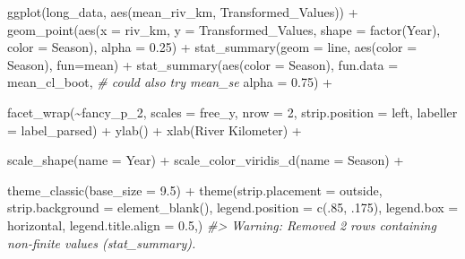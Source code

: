 \documentclass[
]{article}
\newenvironment{Shaded}{\begin{snugshade}}{\end{snugshade}}
\newcommand{\AttributeTok}[1]{\textcolor[rgb]{0.77,0.63,0.00}{#1}}
\newcommand{\CommentTok}[1]{\textcolor[rgb]{0.56,0.35,0.01}{\textit{#1}}}
\newcommand{\DecValTok}[1]{\textcolor[rgb]{0.00,0.00,0.81}{#1}}
\newcommand{\FloatTok}[1]{\textcolor[rgb]{0.00,0.00,0.81}{#1}}
\newcommand{\FunctionTok}[1]{\textcolor[rgb]{0.00,0.00,0.00}{#1}}
\newcommand{\NormalTok}[1]{#1}
\newcommand{\SpecialCharTok}[1]{\textcolor[rgb]{0.00,0.00,0.00}{#1}}
\newcommand{\StringTok}[1]{\textcolor[rgb]{0.31,0.60,0.02}{#1}}
\begin{document}
\begin{Shaded}
\begin{Highlighting}[]
\FunctionTok{ggplot}\NormalTok{(long\_data, }\FunctionTok{aes}\NormalTok{(mean\_riv\_km, Transformed\_Values)) }\SpecialCharTok{+}
  \FunctionTok{geom\_point}\NormalTok{(}\FunctionTok{aes}\NormalTok{(}\AttributeTok{x =}\NormalTok{ riv\_km, }\AttributeTok{y =}\NormalTok{ Transformed\_Values, }
                 \AttributeTok{shape =} \FunctionTok{factor}\NormalTok{(Year), }\AttributeTok{color =}\NormalTok{ Season), }
             \AttributeTok{alpha =} \FloatTok{0.25}\NormalTok{) }\SpecialCharTok{+}
  \FunctionTok{stat\_summary}\NormalTok{(}\AttributeTok{geom =} \StringTok{\textquotesingle{}line\textquotesingle{}}\NormalTok{,}
               \FunctionTok{aes}\NormalTok{(}\AttributeTok{color =}\NormalTok{ Season),}
               \AttributeTok{fun=}\NormalTok{mean) }\SpecialCharTok{+}
  \FunctionTok{stat\_summary}\NormalTok{(}\FunctionTok{aes}\NormalTok{(}\AttributeTok{color =}\NormalTok{ Season), }
               \AttributeTok{fun.data =}\NormalTok{ mean\_cl\_boot,  }\CommentTok{\# could also try mean\_se}
               \AttributeTok{alpha =} \FloatTok{0.75}\NormalTok{) }\SpecialCharTok{+}

  \FunctionTok{facet\_wrap}\NormalTok{(}\SpecialCharTok{\textasciitilde{}}\NormalTok{fancy\_p\_2, }
             \AttributeTok{scales =} \StringTok{\textquotesingle{}free\_y\textquotesingle{}}\NormalTok{, }
             \AttributeTok{nrow =} \DecValTok{2}\NormalTok{,}
             \AttributeTok{strip.position =} \StringTok{\textquotesingle{}left\textquotesingle{}}\NormalTok{,}
             \AttributeTok{labeller =}\NormalTok{ label\_parsed) }\SpecialCharTok{+}
  \FunctionTok{ylab}\NormalTok{(}\StringTok{\textquotesingle{}\textquotesingle{}}\NormalTok{) }\SpecialCharTok{+}
  \FunctionTok{xlab}\NormalTok{(}\StringTok{\textquotesingle{}River Kilometer\textquotesingle{}}\NormalTok{) }\SpecialCharTok{+}

  \FunctionTok{scale\_shape}\NormalTok{(}\AttributeTok{name =} \StringTok{\textquotesingle{}Year\textquotesingle{}}\NormalTok{) }\SpecialCharTok{+}
  \FunctionTok{scale\_color\_viridis\_d}\NormalTok{(}\AttributeTok{name =} \StringTok{\textquotesingle{}Season\textquotesingle{}}\NormalTok{) }\SpecialCharTok{+}

  \FunctionTok{theme\_classic}\NormalTok{(}\AttributeTok{base\_size =} \FloatTok{9.5}\NormalTok{) }\SpecialCharTok{+}
  \FunctionTok{theme}\NormalTok{(}\AttributeTok{strip.placement =} \StringTok{\textquotesingle{}outside\textquotesingle{}}\NormalTok{,}
        \AttributeTok{strip.background =} \FunctionTok{element\_blank}\NormalTok{(),}
        \AttributeTok{legend.position =} \FunctionTok{c}\NormalTok{(.}\DecValTok{85}\NormalTok{, .}\DecValTok{175}\NormalTok{), }
        \AttributeTok{legend.box =} \StringTok{\textquotesingle{}horizontal\textquotesingle{}}\NormalTok{,}
        \AttributeTok{legend.title.align =} \FloatTok{0.5}\NormalTok{,)}
\CommentTok{\#\textgreater{} Warning: Removed 2 rows containing non{-}finite values (stat\_summary).}


\end{Highlighting}
\end{Shaded}
\end{document}
